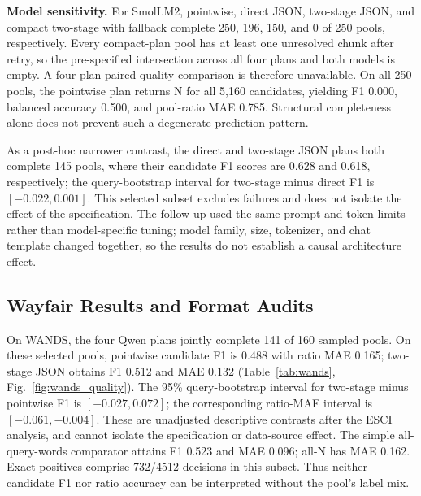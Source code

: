 \documentclass[conference]{IEEEtran}
\begin{document}
\textbf{Model sensitivity.}
For SmolLM2, pointwise, direct JSON, two-stage JSON, and compact two-stage with fallback complete 250, 196, 150, and 0 of 250 pools, respectively. Every compact-plan pool has at least one unresolved chunk after retry, so the pre-specified intersection across all four plans and both models is empty. A four-plan paired quality comparison is therefore unavailable. On all 250 pools, the pointwise plan returns N for all 5,160 candidates, yielding F1 0.000, balanced accuracy 0.500, and pool-ratio MAE 0.785. Structural completeness alone does not prevent such a degenerate prediction pattern.

As a post-hoc narrower contrast, the direct and two-stage JSON plans both complete 145 pools, where their candidate F1 scores are 0.628 and 0.618, respectively; the query-bootstrap interval for two-stage minus direct F1 is $[-0.022,0.001]$. This selected subset excludes failures and does not isolate the effect of the specification. The follow-up used the same prompt and token limits rather than model-specific tuning; model family, size, tokenizer, and chat template changed together, so the results do not establish a causal architecture effect.

\subsection{Wayfair Results and Format Audits}
On WANDS, the four Qwen plans jointly complete 141 of 160 sampled pools. On these selected pools, pointwise candidate F1 is 0.488 with ratio MAE 0.165; two-stage JSON obtains F1 0.512 and MAE 0.132 (Table~\ref{tab:wands}, Fig.~\ref{fig:wands_quality}). The 95\% query-bootstrap interval for two-stage minus pointwise F1 is $[-0.027,0.072]$; the corresponding ratio-MAE interval is $[-0.061,-0.004]$. These are unadjusted descriptive contrasts after the ESCI analysis, and cannot isolate the specification or data-source effect. The simple all-query-words comparator attains F1 0.523 and MAE 0.096; all-N has MAE 0.162. Exact positives comprise 732/4512 decisions in this subset. Thus neither candidate F1 nor ratio accuracy can be interpreted without the pool's label mix.
\end{document}
